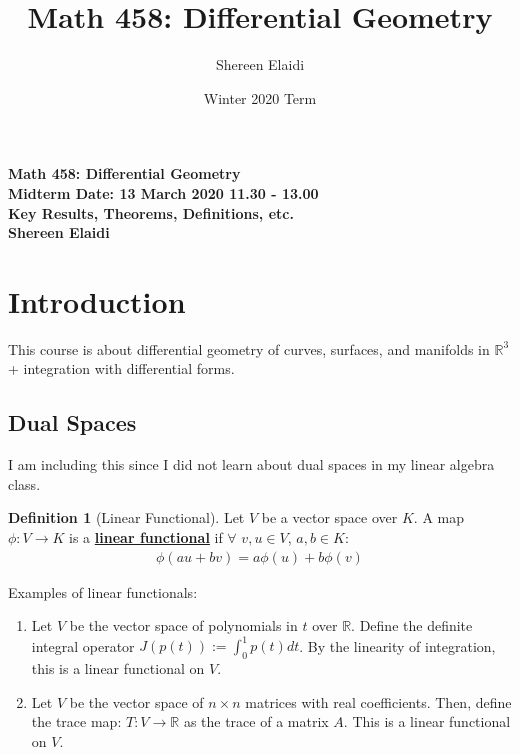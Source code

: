 \documentclass[11pt]{scrartcl}
\title{\textbf{Math 458: Differential Geometry}}
\author{Shereen Elaidi}
\date{Winter 2020 Term}
\newcommand{\R}[0]{\mathbb{R}}
\theoremstyle{definition}
\newtheorem{definition}{Definition}
\theoremstyle{remark}
\newcommand{\dfn}[1]{\textbf{\underline{#1}}}
\newcommand{\idx}[2]{\int_{#1}^{#2}}
\begin{document}
\begin{center}
	\textbf{Math 458: Differential Geometry} \\
	\textbf{Midterm Date: 13 March 2020 11.30 - 13.00} \\
	\textbf{Key Results, Theorems, Definitions, etc.} \\
	\textbf{Shereen Elaidi}
\end{center}



\tableofcontents
\pagestyle{fancy}
\lfoot{}
\cfoot{}
\rfoot{}
\renewcommand{\headrulewidth}{0.4pt}
\renewcommand{\footrulewidth}{0.4pt}
\setlength{\tabcolsep}{0.5em} %
{\renewcommand{\arraystretch}{1.2}%

\section{Introduction}
This course is about differential geometry of curves, surfaces, and manifolds in $\R^3$ + integration with differential forms. 
\subsection{Dual Spaces}
I am including this since I did not learn about dual spaces in my linear algebra class.

\begin{definition}[Linear Functional]
	Let $V$ be a vector space over $K$. A map $\phi: V \rightarrow K$ is a \dfn{linear functional} if $\forall$ $v , u \in V$, $a, b \in K$: 
	\begin{align}
		\phi(au+ bv) = a \phi(u) + b \phi(v) 	
	\end{align}
\end{definition}
Examples of linear functionals: 
\begin{enumerate}[noitemsep]
	\item Let $V$ be the vector space of polynomials in $t$ over $\R$. Define the definite integral operator $J(p(t)):= \idx{0}{1} p(t)dt$. By the linearity of integration, this is a linear functional on $V$. 
	\item Let $V$ be the vector space of $n \times n$ matrices with real coefficients. Then, define the trace map: $T: V \rightarrow \R$ as the trace of a matrix $A$. This is a linear functional on $V$. 
\end{enumerate}

}
\end{document}
